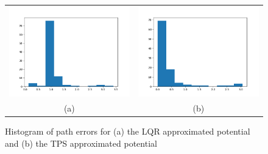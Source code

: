 \documentclass[12pt,a4paper]{article}
\begin{document}
\begin{figure}
\centering
\begin{tabular}{cc}
\includegraphics[scale=.5]{./Figs/lqr_ham_hist.png} & \includegraphics[scale=.5]{./Figs/tps_ham_hist.png}\\
(a) & (b)\\
\end{tabular}
\caption{Histogram of path errors for (a) the LQR approximated potential and (b) the TPS approximated potential}
\end{figure}
\end{document}
